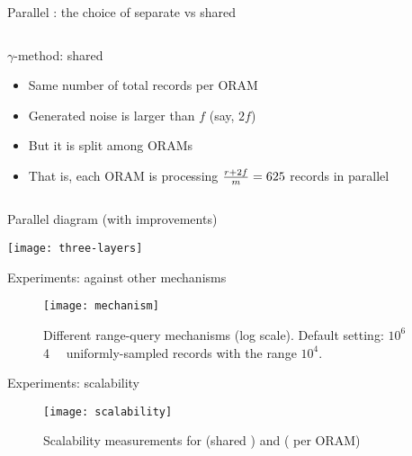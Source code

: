 \begin{frame}{Parallel \epsolute{}: the choice of separate vs shared \serverDS{}}
\begin{columns}[T]
\begin{column}{0.5\textwidth}
{\begin{block}{$\gamma$-method: shared \serverDS{}}
						\begin{itemize}[leftmargin=*]
							\item Same number of total records per ORAM
							\item Generated noise is larger than $f$ (say, $2f$)
							\item But it is split among \oramsNumber{} ORAMs
							\item That is, each ORAM is processing $\frac{r + 2f}{m} = \num{625}$ records in parallel
						\end{itemize}

					\end{block}
				}

			\end{column}

		\end{columns}

	\end{frame}

	\begin{frame}{Parallel \epsolute{} diagram (with improvements)}

		\centering
		\texttt{[image: three-layers]}

	\end{frame}

	\begin{frame}{Experiments: against other mechanisms}

		\begin{figure}[h]
			\centering
			\texttt{[image: mechanism]}
			\caption{
				\centering
				Different range-query mechanisms (log scale).
				Default setting: $10^6$ \SI{4}{\kibi\byte} uniformly-sampled records with the range $10^4$.
			}%
		\end{figure}

	\end{frame}

	\begin{frame}{Experiments: scalability}

		\begin{figure}[h]
			\centering
			\texttt{[image: scalability]}
			\caption{Scalability measurements for \protocolGamma{} (shared \serverDS{}) and \protocolNoGamma{} (\serverDS{} per ORAM)}%
		\end{figure}

	\end{frame}
